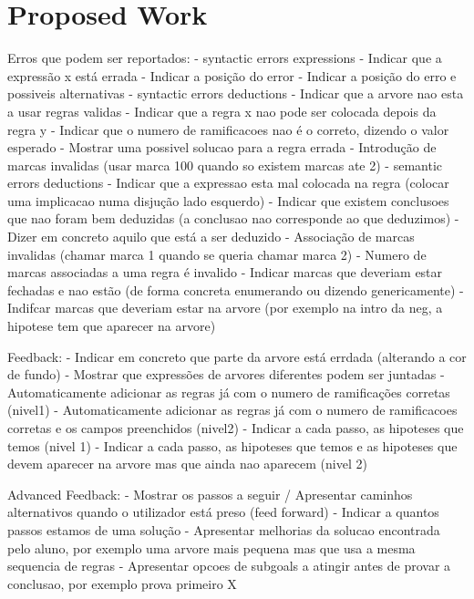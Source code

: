 
%

\chapter{Proposed Work}

Erros que podem ser reportados:
- syntactic errors expressions
    - Indicar que a expressão x está errada
    - Indicar a posição do error
    - Indicar a posição do erro e possiveis alternativas
- syntactic errors deductions
    - Indicar que a arvore nao esta a usar regras validas
    - Indicar que a regra x nao pode ser colocada depois da regra y
    - Indicar que o numero de ramificacoes nao é o correto, dizendo o valor esperado
    - Mostrar uma possivel solucao para a regra errada
    - Introdução de marcas invalidas (usar marca 100 quando so existem marcas ate 2)
- semantic errors deductions
    - Indicar que a expressao esta mal colocada na regra (colocar uma implicacao numa disjução lado esquerdo)
    - Indicar que existem conclusoes que nao foram bem deduzidas (a conclusao nao corresponde ao que deduzimos)
    - Dizer em concreto aquilo que está a ser deduzido
    - Associação de marcas invalidas (chamar marca 1 quando se queria chamar marca 2)
    - Numero de marcas associadas a uma regra é invalido
    - Indicar marcas que deveriam estar fechadas e nao estão (de forma concreta enumerando ou dizendo genericamente)
    - Indifcar marcas que deveriam estar na arvore (por exemplo na intro da neg, a hipotese tem que aparecer na arvore)

Feedback:
    - Indicar em concreto que parte da arvore está errdada (alterando a cor de fundo)
    - Mostrar que expressões de arvores diferentes podem ser juntadas
    - Automaticamente adicionar as regras já com o numero de ramificações corretas (nivel1)
    - Automaticamente adicionar as regras já com o numero de ramificacoes corretas e os campos preenchidos (nivel2)
    - Indicar a cada passo, as hipoteses que temos (nivel 1)
    - Indicar a cada passo, as hipoteses que temos e as hipoteses que devem aparecer na arvore mas que ainda nao aparecem (nivel 2)

Advanced Feedback:
    - Mostrar os passos a seguir / Apresentar caminhos alternativos quando o utilizador está preso (feed forward)
    - Indicar a quantos passos estamos de uma solução
    - Apresentar melhorias da solucao encontrada pelo aluno, por exemplo uma arvore mais pequena mas que usa a mesma sequencia de regras
    - Apresentar opcoes de subgoals a atingir antes de provar a conclusao, por exemplo prova primeiro X

